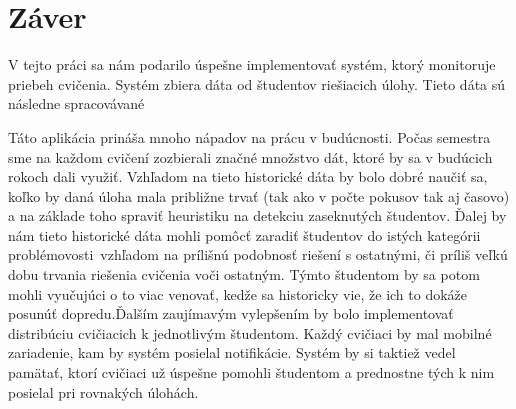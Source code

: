 \chapter*{Záver}  %

V tejto práci sa nám podarilo úspešne implementovať systém, ktorý monitoruje priebeh
cvičenia. Systém zbiera dáta od študentov riešiacich úlohy. Tieto dáta sú následne
spracovávané 

Táto aplikácia prináša mnoho nápadov na prácu v budúcnosti. Počas semestra
sme na každom cvičení zozbierali značné množstvo dát, ktoré by sa v budúcich rokoch
dali využiť.
Vzhľadom na tieto historické dáta by bolo dobré naučiť sa, koľko by daná úloha mala
približne trvať (tak ako v počte pokusov tak aj časovo) a na základe toho spraviť
heuristiku na detekciu zaseknutých študentov.
Ďalej by nám tieto historické dáta mohli pomôcť zaradiť študentov do istých
\glqq kategórii problémovosti\grqq~vzhľadom na prílišnú podobnosť riešení s ostatnými,
či príliš veľkú dobu trvania riešenia cvičenia voči ostatným. Týmto študentom by sa
potom mohli vyučujúci o to viac venovať, kedže sa historicky vie, že ich to dokáže
posunúť dopredu.Ďalším zaujímavým vylepšením by bolo implementovať distribúciu cvičiacich
k jednotlivým
študentom. Každý cvičiaci by mal mobilné zariadenie, kam by systém posielal
notifikácie. Systém by si taktiež vedel pamätať, ktorí cvičiaci už úspešne pomohli
študentom a prednostne tých k nim posielal pri rovnakých úlohách.


